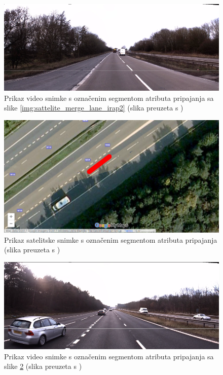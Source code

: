 \documentclass[times, utf8, diplomski, numeric]{fer}
\begin{document}
\begin{figure}[H]
\centering
\includegraphics[scale=0.5]{images/video_merge_lane_irap2.png}
\caption{Prikaz video snimke s označenim segmentom atributa pripajanja sa slike \ref{img:sattelite_merge_lane_irap2} (slika preuzeta s \citep{url:ftts_irap})}
\label{img:video_merge_lane_irap2}
\end{figure}

\begin{figure}[H]
\centering
\includegraphics[scale=0.35]{images/sattelite_merge_lane_irap3.png}
\caption{Prikaz satelitske snimke s označenim segmentom atributa pripajanja (slika preuzeta s \citep{url:google_maps})}
\label{img:sattelite_merge_lane_irap3}
\end{figure}

\begin{figure}[H]
\centering
\includegraphics[scale=0.5]{images/video_merge_lane_irap3.png}
\caption{Prikaz video snimke s označenim segmentom atributa pripajanja sa slike \ref{img:sattelite_merge_lane_irap3} (slika preuzeta s \citep{url:ftts_irap})}
\label{img:video_merge_lane_irap3}
\end{figure}
\end{document}
